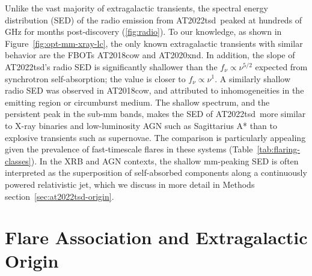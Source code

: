 \documentclass{nature_plusfigure}
\newcommand{\at}{AT2022tsd}
\begin{document}
\begin{methods}
Unlike the vast majority of extragalactic transients, the spectral energy distribution (SED) of the radio emission from \at\ peaked at hundreds of GHz for months post-discovery (\ref{fig:radio}). To our knowledge, as shown in Figure~\ref{fig:opt-mm-xray-lc}, the only known extragalactic transients with similar behavior are the FBOTs AT2018cow\cite{Ho2019} and AT2020xnd\cite{Ho2022_AT2020xnd,Bright2022}.
In addition, the slope of \at's radio SED is significantly shallower than the $f_\nu \propto \nu^{5/2}$ expected from synchrotron self-absorption\cite{Rybicki1986}; the value is closer to $f_\nu \propto \nu^{1}$. A similarly shallow radio SED was observed in AT2018cow\cite{Nayana2021}, and attributed to inhomogeneities in the emitting region or circumburst medium\cite{Nayana2021}.
The shallow spectrum, and the persistent peak in the sub-mm bands, makes the SED of \at\ more similar to X-ray binaries\cite{Fender2001,Tetarenko2021,Fender2023} and low-luminosity AGN such as Sagittarius A*\cite{Falcke1998} than to explosive transients such as supernovae. The comparison is particularly appealing given the prevalence of fast-timescale flares in these systems (Table~\ref{tab:flaring-classes}). In the XRB and AGN contexts, the shallow mm-peaking SED is often interpreted as the superposition of self-absorbed components along a continuously powered relativistic jet\cite{Blandford1979}, which we discuss in more detail in Methods section~\ref{sec:at2022tsd-origin}.

\section{Flare Association and Extragalactic Origin}
\label{sec:flare-association}


\end{methods}
\end{document}
